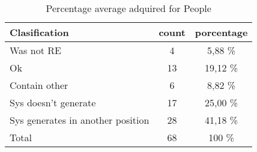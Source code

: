 \begin{table}[h!]
\begin{center}
\begin{tabular}{|l|c|c|}
\hline
Clasification & count & porcentage \\
\hline

Was not RE	&	4	&	5,88	\%	\\
Ok	&	13	&	19,12	\%	\\
Contain other	&	6	&	8,82	\%	\\
Sys doesn't generate	&	17	&	25,00	\%	\\
Sys generates in another position	&	28	&	41,18	\%	\\
\hline
Total	&	68	&	100	\%	\\

\hline
\end{tabular}
\caption{Percentage average adquired for People}
\end{center}
\end{table}

